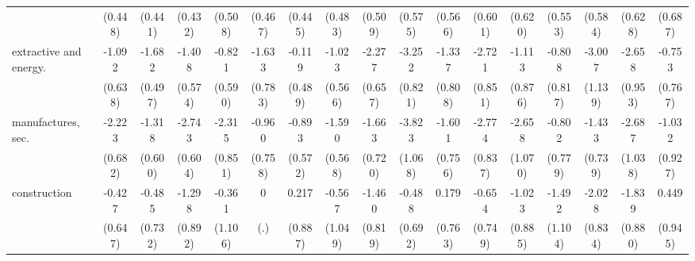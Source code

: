 {\begin{tabular}{l*{16}{c}}
                    &     (0.448)         &     (0.441)         &     (0.432)         &     (0.508)         &     (0.467)         &     (0.445)         &     (0.483)         &     (0.509)         &     (0.575)         &     (0.566)         &     (0.601)         &     (0.620)         &     (0.553)         &     (0.584)         &     (0.628)         &     (0.687)         \\
[1em]
extractive and energy.&      -1.092         &      -1.682\sym{***}&      -1.408\sym{*}  &      -0.821         &      -1.633\sym{*}  &      -0.119         &      -1.023         &      -2.277\sym{***}&      -3.252\sym{***}&      -1.337         &      -2.721\sym{**} &      -1.113         &      -0.808         &      -3.007\sym{**} &      -2.658\sym{**} &      -0.753         \\
                    &     (0.638)         &     (0.497)         &     (0.574)         &     (0.590)         &     (0.783)         &     (0.489)         &     (0.566)         &     (0.657)         &     (0.821)         &     (0.808)         &     (0.851)         &     (0.876)         &     (0.817)         &     (1.139)         &     (0.953)         &     (0.767)         \\
[1em]
manufactures, sec.  &      -2.223\sym{**} &      -1.318\sym{*}  &      -2.743\sym{***}&      -2.315\sym{**} &      -0.960         &      -0.893         &      -1.590\sym{**} &      -1.663\sym{*}  &      -3.823\sym{***}&      -1.601\sym{*}  &      -2.774\sym{***}&      -2.658\sym{*}  &      -0.802         &      -1.433         &      -2.687\sym{**} &      -1.032         \\
                    &     (0.682)         &     (0.600)         &     (0.604)         &     (0.851)         &     (0.758)         &     (0.572)         &     (0.568)         &     (0.720)         &     (1.068)         &     (0.756)         &     (0.837)         &     (1.070)         &     (0.779)         &     (0.739)         &     (1.038)         &     (0.927)         \\
[1em]
construction        &      -0.427         &      -0.485         &      -1.298         &      -0.361         &           0         &       0.217         &      -0.567         &      -1.460         &      -0.488         &       0.179         &      -0.654         &      -1.023         &      -1.492         &      -2.028\sym{*}  &      -1.839\sym{*}  &       0.449         \\
                    &     (0.647)         &     (0.732)         &     (0.892)         &     (1.106)         &         (.)         &     (0.887)         &     (1.049)         &     (0.819)         &     (0.692)         &     (0.763)         &     (0.749)         &     (0.885)         &     (1.104)         &     (0.834)         &     (0.880)         &     (0.945)         \\

\end{tabular}}
